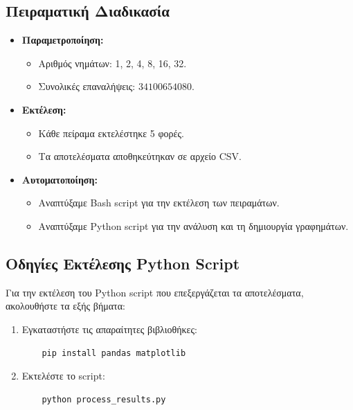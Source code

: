 \documentclass{article}
\begin{document}
\subsection*{Πειραματική Διαδικασία}
\begin{itemize} 
    \item \textbf{Παραμετροποίηση:} 
    \begin{itemize} 
        \item Αριθμός νημάτων: 1, 2, 4, 8, 16, 32. 
        \item Συνολικές επαναλήψεις: $34100654080$. 
    \end{itemize} 
    \item \textbf{Εκτέλεση:} 
    \begin{itemize} 
        \item Κάθε πείραμα εκτελέστηκε 5 φορές. 
        \item Τα αποτελέσματα αποθηκεύτηκαν σε αρχείο CSV. 
    \end{itemize} \item \textbf{Αυτοματοποίηση:} \begin{itemize} 
        \item Αναπτύξαμε Bash script για την εκτέλεση των πειραμάτων. 
        \item Αναπτύξαμε Python script για την ανάλυση και τη δημιουργία γραφημάτων. 
    \end{itemize} 
\end{itemize}
\subsection*{Οδηγίες Εκτέλεσης Python Script}
Για την εκτέλεση του Python script που επεξεργάζεται τα αποτελέσματα, ακολουθήστε τα εξής βήματα:
\begin{enumerate}
    \item Εγκαταστήστε τις απαραίτητες βιβλιοθήκες:
    \begin{verbatim}
    pip install pandas matplotlib
    \end{verbatim}
    \item Εκτελέστε το script:
    \begin{verbatim}
    python process_results.py
    \end{verbatim}
\end{enumerate}
\end{document}
